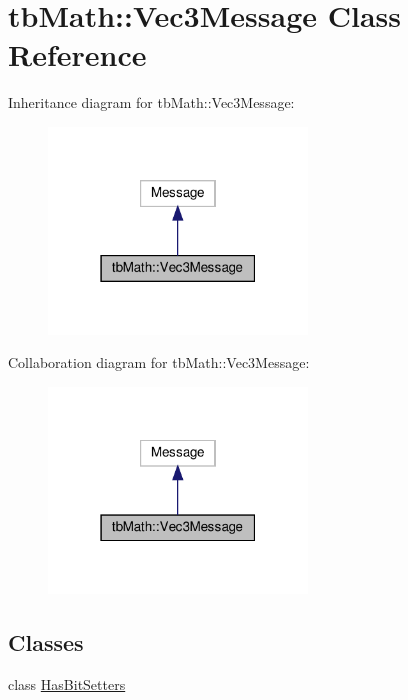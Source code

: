 \hypertarget{classtbMath_1_1Vec3Message}{}\section{tb\+Math\+:\+:Vec3\+Message Class Reference}
\label{classtbMath_1_1Vec3Message}


Inheritance diagram for tb\+Math\+:\+:Vec3\+Message\+:
\nopagebreak
\begin{figure}[H]
\begin{center}
\leavevmode
\includegraphics[width=195pt]{classtbMath_1_1Vec3Message__inherit__graph}
\end{center}
\end{figure}


Collaboration diagram for tb\+Math\+:\+:Vec3\+Message\+:
\nopagebreak
\begin{figure}[H]
\begin{center}
\leavevmode
\includegraphics[width=195pt]{classtbMath_1_1Vec3Message__coll__graph}
\end{center}
\end{figure}
\subsection*{Classes}
\begin{DoxyCompactItemize}
\item 
class \hyperlink{classtbMath_1_1Vec3Message_1_1HasBitSetters}{Has\+Bit\+Setters}
\end{DoxyCompactItemize}
